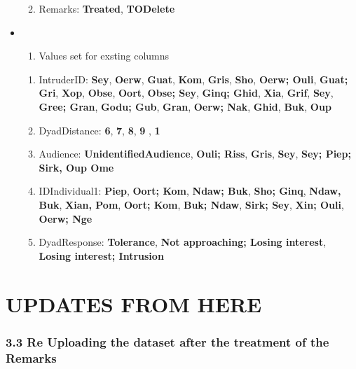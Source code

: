 \documentclass[
]{article}
\providecommand{\tightlist}{%
  \setlength{\itemsep}{0pt}\setlength{\parskip}{0pt}}
\begin{document}
\begin{itemize}
  \begin{enumerate}
  \def\labelenumi{\alph{enumi}.}
  \setcounter{enumi}{3}
  \tightlist
  \item
    Remarks: \textbf{Treated}, \textbf{TODelete}
  \end{enumerate}
\item
  \begin{enumerate}
  \def\labelenumi{\arabic{enumi}.}
  \setcounter{enumi}{3}
  \tightlist
  \item
    Values set for exsting columns
  \end{enumerate}

  \begin{enumerate}
  \def\labelenumi{\alph{enumi}.}
  \item
    IntruderID: \textbf{Sey}, \textbf{Oerw}, \textbf{Guat},
    \textbf{Kom}, \textbf{Gris}, \textbf{Sho}, \textbf{Oerw; Ouli},
    \textbf{Guat; Gri}, \textbf{Xop}, \textbf{Obse}, \textbf{Oort},
    \textbf{Obse; Sey}, \textbf{Ginq; Ghid}, \textbf{Xia},
    \textbf{Grif}, \textbf{Sey}, \textbf{Gree; Gran}, \textbf{Godu;
    Gub}, \textbf{Gran}, \textbf{Oerw; Nak}, \textbf{Ghid},
    \textbf{Buk}, \textbf{Oup}
  \item
    DyadDistance: \textbf{6}, \textbf{7}, \textbf{8}, \textbf{9} ,
    \textbf{1}
  \item
    Audience: \textbf{UnidentifiedAudience}, \textbf{Ouli; Riss},
    \textbf{Gris}, \textbf{Sey}, \textbf{Sey; Piep; Sirk, Oup Ome}
  \item
    IDIndividual1: \textbf{Piep}, \textbf{Oort; Kom}, \textbf{Ndaw;
    Buk}, \textbf{Sho; Ginq}, \textbf{Ndaw, Buk}, \textbf{Xian, Pom},
    \textbf{Oort; Kom}, \textbf{Buk; Ndaw}, \textbf{Sirk; Sey},
    \textbf{Xin; Ouli}, \textbf{Oerw; Nge}
  \item
    DyadResponse: \textbf{Tolerance}, \textbf{Not approaching; Losing
    interest}, \textbf{Losing interest; Intrusion}
  \end{enumerate}
\end{itemize}

\hypertarget{updates-from-here}{%
\section{UPDATES FROM HERE}\label{updates-from-here}}

\hypertarget{re-uploading-the-dataset-after-the-treatment-of-the-remarks}{%
\subsubsection{3.3 Re Uploading the dataset after the treatment of the
Remarks}\label{re-uploading-the-dataset-after-the-treatment-of-the-remarks}}
\end{document}
